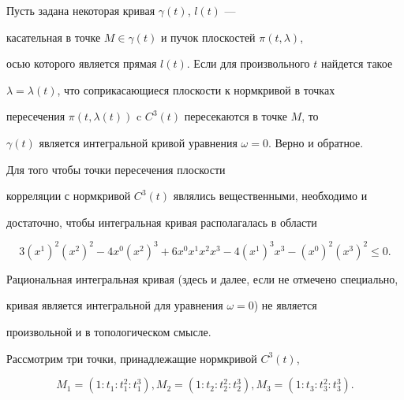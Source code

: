 \begin{thm}


Пусть задана некоторая кривая $\gamma(t)$, $l(t)$ --- 


касательная в точке $M\in\gamma(t)$ и пучок плоскостей $\pi(t,\lambda)$, 


осью которого является прямая $l(t)$. Если для произвольного $t$ найдется такое  


$\lambda=\lambda(t)$, что соприкасающиеся плоскости к нормкривой в точках 


пересечения $\pi(t,\lambda(t))$ c $C^3(t)$ пересекаются в точке $M$, то 


$\gamma(t)$ является интегральной кривой уравнения $\omega=0$. Верно и обратное.


\end{thm}








\begin{asrtnonum}


Для того чтобы точки пересечения плоскости 


корреляции с нормкривой $C^3(t)$ являлись вещественными, необходимо и 


достаточно, чтобы интегральная кривая располагалась в области


$$


3(x^1)^2(x^2)^2-4x^0(x^2)^3+6x^0x^1x^2x^3-4(x^1)^3x^3-(x^0)^2(x^3)^2\leq 0.


$$


\end{asrtnonum}





Рациональная интегральная кривая (здесь и далее, если не отмечено специально, 


кривая является интегральной для уравнения $\omega=0$) не является 


произвольной и в топологическом смысле.  





Рассмотрим три точки, принадлежащие нормкривой $C^3(t)$,


$$


M_1=(1:t_1:t_1^2:t_1^3),M_2=(1:t_2:t_2^2:t_2^3),M_3=(1:t_3:t_3^2:t_3^3).


$$








